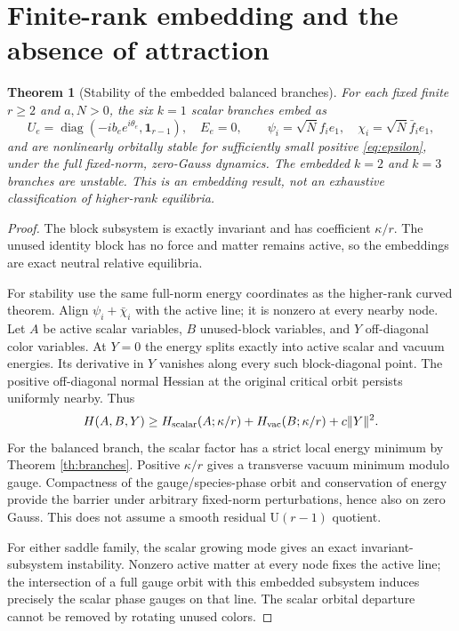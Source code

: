 \documentclass[11pt,a4paper]{article}
\newtheorem{theorem}{Theorem}\newtheorem{lemma}[theorem]{Lemma}\newtheorem{proposition}[theorem]{Proposition}
\newcommand{\id}{\mathbf1}\newcommand{\tr}{\operatorname{tr}}\newcommand{\diag}{\operatorname{diag}}\newcommand{\Rea}{\operatorname{Re}}
\begin{document}
\section{Finite-rank embedding and the absence of attraction}
\begin{theorem}[Stability of the embedded balanced branches]\label{th:rank}
For each fixed finite $r\ge2$ and $a,N>0$, the six $k=1$ scalar branches embed as
\[
U_e=\diag(-ib_e e^{i\theta_e},\id_{r-1}),\quad E_e=0,
\qquad\psi_i=\sqrt N f_i e_1,\quad\chi_i=\sqrt N\bar f_i e_1,
\]
and are nonlinearly orbitally stable for sufficiently small positive \eqref{eq:epsilon}, under the full fixed-norm, zero-Gauss dynamics. The embedded $k=2$ and $k=3$ branches are unstable. This is an embedding result, not an exhaustive classification of higher-rank equilibria.
\end{theorem}
\begin{proof}
The block subsystem is exactly invariant and has coefficient $\kappa/r$. The unused identity block has no force and matter remains active, so the embeddings are exact neutral relative equilibria.

For stability use the same full-norm energy coordinates as the higher-rank curved theorem. Align $\psi_i+\bar\chi_i$ with the active line; it is nonzero at every nearby node. Let $A$ be active scalar variables, $B$ unused-block variables, and $Y$ off-diagonal color variables. At $Y=0$ the energy splits exactly into active scalar and vacuum energies. Its derivative in $Y$ vanishes along every such block-diagonal point. The positive off-diagonal normal Hessian at the original critical orbit persists uniformly nearby. Thus
\[
H(A,B,Y)\ge H_{\rm scalar}(A;\kappa/r)+H_{\rm vac}(B;\kappa/r)+c\|Y\|^2.
\]
For the balanced branch, the scalar factor has a strict local energy minimum by Theorem \ref{th:branches}. Positive $\kappa/r$ gives a transverse vacuum minimum modulo gauge. Compactness of the gauge/species-phase orbit and conservation of energy provide the barrier under arbitrary fixed-norm perturbations, hence also on zero Gauss. This does not assume a smooth residual $\mathrm U(r-1)$ quotient.

For either saddle family, the scalar growing mode gives an exact invariant-subsystem instability. Nonzero active matter at every node fixes the active line; the intersection of a full gauge orbit with this embedded subsystem induces precisely the scalar phase gauges on that line. The scalar orbital departure cannot be removed by rotating unused colors.
\end{proof}
\end{document}
